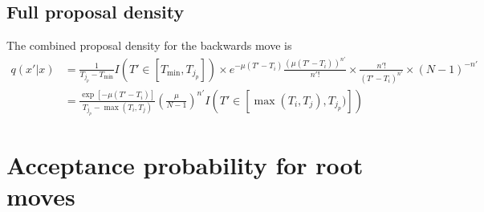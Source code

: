 \documentclass[a4paper,11pt]{article}
\begin{document}
\subsection{Full proposal density}

The combined proposal density for the backwards move is
\begin{align}
  q(x'|x) &= \frac{1}{T_{j_p}-T_{\min}}I(T'\in[T_{\min},T_{j_p}])
\times e^{-\mu(T'-T_i)}\frac{(\mu(T'-T_i))^{n'}}{n'!}
\times \frac{n'!}{(T'-T_i)^{n'}}
\times (N-1)^{-n'}\nonumber\\
&=\frac{\exp[-\mu(T'-T_i)]}{T_{j_p}-\max(T_i,T_j)}\left(\frac{\mu}{N-1}\right)^{n'}
I(T'\in[\max(T_i,T_j),T_{j_p})])
\end{align}

\section{Acceptance probability for root moves}
\end{document}
